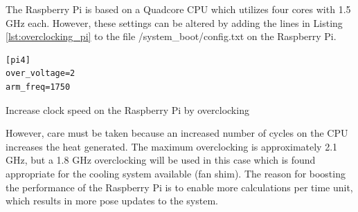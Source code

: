 \documentclass[../Head/report.tex]{subfiles}
\begin{document}
The Raspberry Pi is based on a Quadcore CPU which utilizes four cores with 1.5 GHz each. However, these settings can be altered by adding the lines in Listing \ref{lst:overclocking_pi} to the file /system\_boot/config.txt on the Raspberry Pi.  

\begin{listing}[H] 
\begin{tcolorbox}[
    enhanced,
    attach boxed title to top left={xshift=6mm,yshift=-3mm},
    colback=lightgreen!20,
    colframe=lightgreen,
    fonttitle=\bfseries\color{black},
]
\begin{verbatim}
[pi4]
over_voltage=2
arm_freq=1750
\end{verbatim}
\end{tcolorbox}
\caption{Increase clock speed on the Raspberry Pi by overclocking}
\label{lst:overclocking_pi}    
\end{listing} 

However, care must be taken because an increased number of cycles on the CPU increases the heat generated. The maximum overclocking is approximately 2.1 GHz, but a 1.8 GHz overclocking will be used in this case which is found appropriate for the cooling system available (fan shim). The reason for boosting the performance of the Raspberry Pi is to enable more calculations per time unit, which results in more pose updates to the system. 
\end{document}
